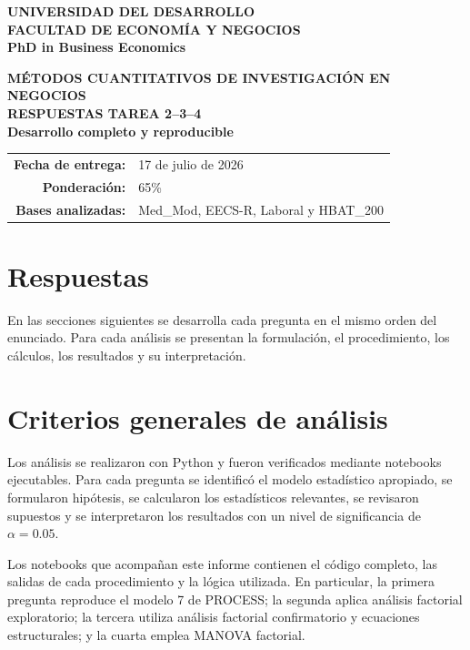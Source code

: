 \documentclass[11pt,letterpaper]{article}
\begin{document}
\begin{titlepage}
\begin{center}
{\large\textbf{UNIVERSIDAD DEL DESARROLLO}}\\
{\large\textbf{FACULTAD DE ECONOMÍA Y NEGOCIOS}}\\
{\large\textbf{PhD in Business Economics}}

\vspace{2.5cm}
{\LARGE\textbf{MÉTODOS CUANTITATIVOS DE INVESTIGACIÓN EN NEGOCIOS}}\\[1cm]
{\Huge\textbf{RESPUESTAS TAREA 2--3--4}}\\[0.5cm]
{\Large\textbf{Desarrollo completo y reproducible}}

\vfill
\begin{tabular}{rl}
\textbf{Fecha de entrega:} & 17 de julio de 2026\\
\textbf{Ponderación:} & 65\%\\
\textbf{Bases analizadas:} & Med\_Mod, EECS-R, Laboral y HBAT\_200
\end{tabular}
\vfill
\end{center}
\end{titlepage}

\tableofcontents
\newpage

\section*{Respuestas}

En las secciones siguientes se desarrolla cada pregunta en el mismo orden del enunciado. Para cada análisis se presentan la formulación, el procedimiento, los cálculos, los resultados y su interpretación.

\section{Criterios generales de análisis}

Los análisis se realizaron con Python y fueron verificados mediante notebooks ejecutables. Para cada pregunta se identificó el modelo estadístico apropiado, se formularon hipótesis, se calcularon los estadísticos relevantes, se revisaron supuestos y se interpretaron los resultados con un nivel de significancia de $\alpha=0.05$.

Los notebooks que acompañan este informe contienen el código completo, las salidas de cada procedimiento y la lógica utilizada. En particular, la primera pregunta reproduce el modelo 7 de PROCESS; la segunda aplica análisis factorial exploratorio; la tercera utiliza análisis factorial confirmatorio y ecuaciones estructurales; y la cuarta emplea MANOVA factorial.
\end{document}
